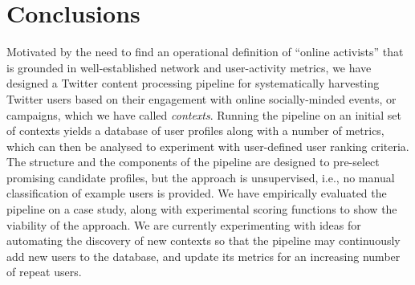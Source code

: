 \vspace{-10pt}
\section{Conclusions}
\vspace{-10pt}

Motivated by the need to find an operational definition of ``online activists'' that is grounded in well-established network and user-activity metrics, we have designed a Twitter content processing pipeline for systematically harvesting Twitter users based on their engagement with online socially-minded events, or campaigns, which we have called \textit{contexts}.
Running the pipeline on an initial set of contexts yields a database of user profiles along with a number of metrics, which can then be analysed to experiment with user-defined user ranking criteria. The structure and the components of the pipeline are designed to pre-select promising candidate profiles, but the approach is unsupervised, i.e., no manual classification of example users is provided.
We have empirically evaluated the pipeline on a case study, along with experimental scoring functions to show the viability of the approach. 
We are currently experimenting with ideas for automating the discovery of new contexts so that the pipeline may continuously add new users to the database, and update its metrics for an increasing number of  repeat users.